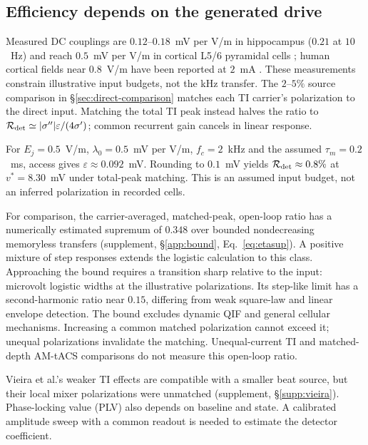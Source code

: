 \documentclass[11pt,a4paper]{article}
\newcommand{\Sig}{\sigma}
\begin{document}
\subsection{Efficiency depends on the generated drive}
Measured DC couplings are $0.12$--$0.18$~mV per V/m in hippocampus
($0.21$ at $10$~Hz) \cite{bikson2004,deans2007} and reach $0.5$~mV per V/m
in cortical L5/6 pyramidal cells \cite{radman2009}; human cortical fields near
$0.8$~V/m have been reported at $2$~mA \cite{huang2017,huang2017corr}.
These measurements constrain illustrative input budgets, not the kHz transfer.
The $2$--$5\%$ source comparison in \S\ref{sec:direct-comparison} matches
each TI carrier's polarization to the direct input. Matching the total TI
peak instead halves the ratio to
$\mathcal R_{\rm det}\simeq|\Sig''|\varepsilon/(4\Sig')$; common recurrent
gain cancels in linear response.

For $E_j=0.5$~V/m, $\lambda_0=0.5$~mV per V/m, $f_c=2$~kHz and the assumed
$\tau_m=0.2$~ms, access gives $\varepsilon\approx0.092$~mV. Rounding to
$0.1$~mV yields $\mathcal R_{\rm det}\approx0.8\%$ at $v^*=8.30$~mV
under total-peak matching. This is an assumed input budget, not an inferred
polarization in recorded cells.

For comparison, the carrier-averaged, matched-peak, open-loop ratio has a
numerically estimated supremum of $0.348$ over bounded nondecreasing memoryless
transfers (supplement, \S\ref{app:bound}, Eq.~\eqref{eq:etasup}). A positive
mixture of step responses extends the logistic calculation to this class.
Approaching the bound requires a transition sharp relative to the input:
microvolt logistic widths at the illustrative polarizations. Its step-like
limit has a second-harmonic ratio near $0.15$, differing from weak square-law
and linear envelope detection. The bound excludes dynamic QIF and general
cellular mechanisms. Increasing a common matched polarization cannot exceed
it; unequal polarizations invalidate the matching. Unequal-current TI and
matched-depth AM-tACS comparisons do not measure this open-loop ratio.

Vieira et al.'s weaker TI effects \cite{vieira2024} are compatible with a
smaller beat source, but their local mixer polarizations were unmatched
(supplement, \S\ref{supp:vieira}). Phase-locking value (PLV) also depends on
baseline and state. A calibrated amplitude sweep with a common readout is
needed to estimate the detector coefficient.
\end{document}
